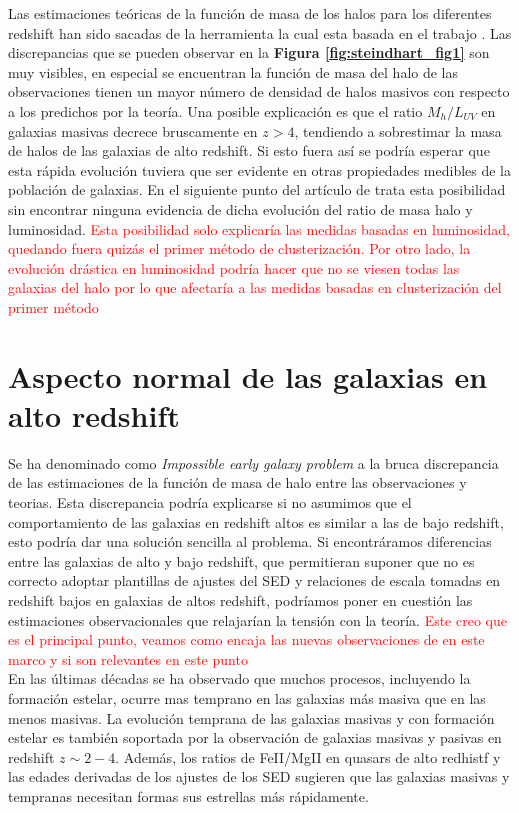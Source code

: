 \documentclass{article}
\begin{document}
Las estimaciones teóricas de la función de masa de los halos para los diferentes redshift han sido sacadas de la herramienta \cite{murray2013hmfcalc} la cual esta basada en el trabajo \cite{sheth2001ellipsoidal}. Las discrepancias que se pueden observar en la \textbf{Figura \ref{fig:steindhart_fig1}} son muy visibles, en especial se encuentran la función de masa del halo de las observaciones tienen un mayor número de densidad de halos masivos con respecto a los predichos por la teoría. Una posible explicación es que el ratio $M_h/L_{UV}$ en galaxias masivas decrece bruscamente en $z>4$, tendiendo a sobrestimar la masa de halos de las galaxias de alto redshift. Si esto fuera así se podría esperar que esta rápida evolución tuviera que ser evidente en otras propiedades medibles de la población de galaxias. En el siguiente punto del artículo de \cite{steinhardt2016impossibly} trata esta posibilidad sin encontrar ninguna evidencia de dicha evolución del ratio de masa halo y luminosidad. \textcolor{red}{Esta posibilidad solo explicaría las medidas basadas en luminosidad, quedando fuera quizás el primer método de clusterización. Por otro lado, la evolución drástica en luminosidad podría hacer que no se viesen todas las galaxias del halo \citep{wang2019dominant} por lo que afectaría a las medidas basadas en clusterización del primer método}

\section*{Aspecto normal de las galaxias en alto redshift}
Se ha denominado como \textit{Impossible early galaxy problem} a la bruca discrepancia de las estimaciones de la función de masa de halo entre las observaciones y teorias. Esta discrepancia podría explicarse si no asumimos que el comportamiento de las galaxias en redshift altos es similar a las de bajo redshift, esto podría dar una solución sencilla al problema. Si encontráramos diferencias entre las galaxias de alto y bajo redshift, que permitieran suponer que no es correcto adoptar plantillas de ajustes del SED y relaciones de escala tomadas en redshift bajos en galaxias de altos redshift, podríamos poner en cuestión las estimaciones observacionales que relajarían la tensión con la teoría. \textcolor{red}{Este creo que es el principal punto, veamos como encaja las nuevas observaciones de \cite{wang2019dominant} en este marco y si son relevantes en este punto}\\

En las últimas décadas se ha observado que muchos procesos, incluyendo la formación estelar, ocurre mas temprano en las galaxias más masiva que en las menos masivas. La evolución temprana de las galaxias masivas y con formación estelar es también soportada por la observación de galaxias masivas y pasivas en redshift $z\sim 2-4$. Además, los ratios de FeII/MgII en quasars de alto redhistf y las edades derivadas de los ajustes de los SED sugieren que las galaxias masivas y tempranas necesitan formas sus estrellas más rápidamente.\\
\end{document}
